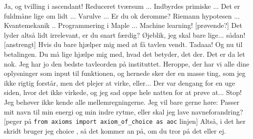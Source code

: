 \documentclass[a4paper,11pt]{article}
\begin{document}
\begin{sketch}
 Ja, og tvilling i ascendant!
 Reduceret tværsum ... Indbyrdes primiske ... Det er fuldmåne lige om lidt ... Varulve ... 
 Er du ok deromme?
 Riemann hypotesen ... Kvantemekanik .. Programmering i Maple ... Machine learning! 
[prøvende?] Det lyder altså lidt irrelevant, er du snart færdig?
 Øjeblik, jeg skal bare lige... sådan!
[anstrengt] Hvis du bare hjælper mig med at få tavlen vendt.
 Tadaaa! Og nu til betalingen.
 Du må lige hjælpe mig med, hvad det betyder, det der. 
 Det er da let nok. Jeg har jo den bedste tavleorden på instituttet. 
 Heroppe, der har vi alle dine oplysninger som input til funktionen, og hernede sker der en masse ting, som jeg ikke rigtig forstår, men det plejer at virke, eller... Der var dengang for en uge siden, hvor det ikke virkede, og jeg sad oppe hele natten for at prøve at...
 Stop! Jeg behøver ikke kende alle mellemregningerne. Jeg vil bare gerne høre: Passer mit navn til min energi og min indre rytme, eller skal jeg lave navneforandring?
[peger på \texttt{from axioms import axiom\_of\_choice as aoc} linjen] Altså, i det her skridt bruger jeg choice , så det kommer an på, om du tror på det eller ej.












\end{sketch}
\end{document}
